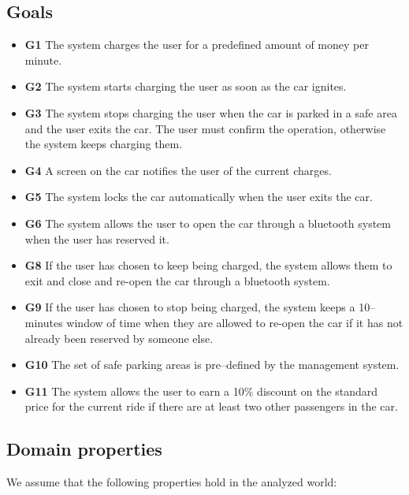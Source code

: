 \documentclass{article}
\begin{document}
		\subsection{Goals}
			\begin{itemize}

				\item \textbf{G1} The system charges the user for a predefined amount of money per minute.
				\item \textbf{G2} The system starts charging the user as soon as the car ignites.
				\item \textbf{G3} The system stops charging the user when the car is parked in a safe area and the user exits the car. The user must confirm the operation, otherwise the system keeps charging them. 
				\item \textbf{G4} A screen on the car notifies the user of the current charges.
				\item \textbf{G5} The system locks the car automatically when the user exits the car. 
				\item \textbf{G6} The system allows the user to open the car through a bluetooth system when the user has reserved it.
				\item \textbf{G8} If the user has chosen to keep being charged, the system allows them to exit and close and re-open the car through a bluetooth system.
				\item \textbf{G9} If the user has chosen to stop being charged, the system keeps a 10–minutes window of time when they are allowed to re-open the car if it has not already been reserved by someone else.
				\item \textbf{G10} The set of safe parking areas is pre–defined by the management system.
				\item \textbf{G11} The system allows the user to earn a 10\% discount on the standard price for the current ride if there are at least two other passengers in the car.

			\end{itemize}

		\subsection{Domain properties}
			
			We assume that the following properties hold in the analyzed world:			
			
\end{document}

